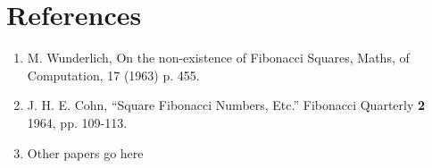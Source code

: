 \documentclass[11pt]{article}
\begin{document}
\section{References}

\begin{enumerate}
\item M. Wunderlich, On the non-existence of Fibonacci Squares, Maths, of Computation, 17 (1963) p. 455. 

\item J. H. E. Cohn, ``Square Fibonacci Numbers, Etc.'' Fibonacci Quarterly \textbf{2} 1964, pp. 109-113.

\item Other papers go here
\end{enumerate}
\end{document}
